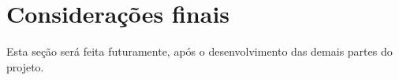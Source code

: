 
\chapter{Considerações finais}
Esta seção será feita futuramente, após o desenvolvimento das demais partes do projeto.
